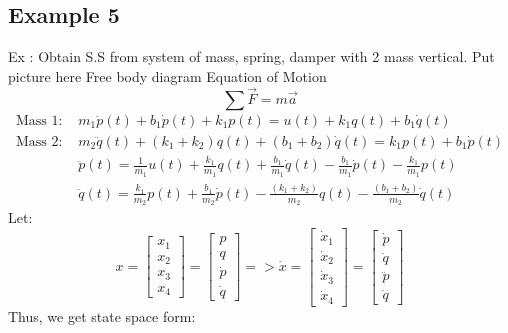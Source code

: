 \documentclass[12pt,a4paper]{article}
\begin{document}
	\subsection{Example 5}
	Ex : Obtain S.S from system of mass, spring, damper with 2 mass vertical.
	Put picture here
	Free body diagram
	Equation of Motion
	\[
	\sum \vec{F} = m\vec{a}
	\]
	\[
	\begin{split}
		\text{Mass 1: }& m_1\ddot{p}(t) + b_1\dot{p}(t) + k_1p(t) = u(t) +k_1q(t)+b_1\dot{q}(t) \\
		\text{Mass 2: }& m_2\ddot{q}(t) + (k_1+k_2)q(t) + (b_1+b_2)\dot{q}(t) = k_1p(t)+b_1\dot{p}(t) \\
		&\ddot{p}(t)= \frac{1}{m_1}u(t) +\frac{k_1}{m_1}q(t)+\frac{b_1}{m_1}\dot{q}(t) - \frac{b_1}{m_1}\dot{p}(t) - \frac{k_1}{m_1}p(t)\\
		&\ddot{q}(t)= \frac{k_1}{m_2}p(t)+\frac{b_1}{m_2}\dot{p}(t) - \frac{(k_1+k_2)}{m_2}q(t) - \frac{(b_1+b_2)}{m_2}\dot{q}(t)
	\end{split}
	\]
	Let:
	\[
	x = 
	\begin{bmatrix}
		x_1 \\
		x_2 \\
		x_3 \\
		x_4 
	\end{bmatrix}
	= 
	\begin{bmatrix}
		p       \\
		q       \\
		\dot{p} \\
		\dot{q} 
	\end{bmatrix}
	=>
	\dot{x} = 
	\begin{bmatrix}
		\dot{x}_1 \\
		\dot{x}_2 \\
		\dot{x}_3 \\
		\dot{x}_4 
	\end{bmatrix}
	= 
	\begin{bmatrix}
		\dot{p}  \\
		\dot{q}  \\
		\ddot{p} \\
		\ddot{q} 
	\end{bmatrix}
	\]
	Thus, we get state space form:
\end{document}
